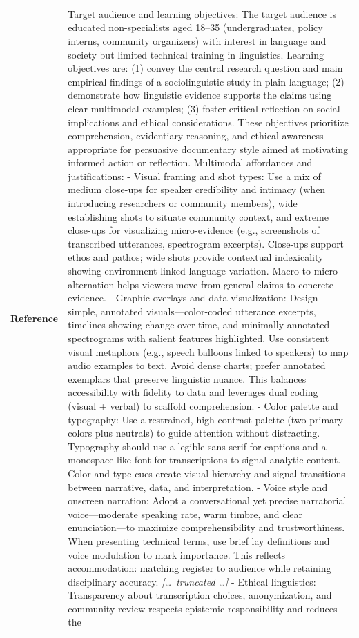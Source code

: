 \begin{longtable}{@{}l p{12.5cm}@{}}
  \textbf{Reference} & Target audience and learning objectives: The target audience is educated non-specialists aged 18--35 (undergraduates, policy interns, community organizers) with interest in language and society but limited technical training in linguistics. Learning objectives are: (1) convey the central research question and main empirical findings of a sociolinguistic study in plain language; (2) demonstrate how linguistic evidence supports the claims using clear multimodal examples; (3) foster critical reflection on social implications and ethical considerations. These objectives prioritize comprehension, evidentiary reasoning, and ethical awareness---appropriate for persuasive documentary style aimed at motivating informed action or reflection. \newline Multimodal affordances and justifications: \newline - Visual framing and shot types: Use a mix of medium close-ups for speaker credibility and intimacy (when introducing researchers or community members), wide establishing shots to situate community context, and extreme close-ups for visualizing micro-evidence (e.g., screenshots of transcribed utterances, spectrogram excerpts). Close-ups support ethos and pathos; wide shots provide contextual indexicality showing environment-linked language variation. Macro-to-micro alternation helps viewers move from general claims to concrete evidence. \newline - Graphic overlays and data visualization: Design simple, annotated visuals---color-coded utterance excerpts, timelines showing change over time, and minimally-annotated spectrograms with salient features highlighted. Use consistent visual metaphors (e.g., speech balloons linked to speakers) to map audio examples to text. Avoid dense charts; prefer annotated exemplars that preserve linguistic nuance. This balances accessibility with fidelity to data and leverages dual coding (visual + verbal) to scaffold comprehension. \newline - Color palette and typography: Use a restrained, high-contrast palette (two primary colors plus neutrals) to guide attention without distracting. Typography should use a legible sans-serif for captions and a monospace-like font for transcriptions to signal analytic content. Color and type cues create visual hierarchy and signal transitions between narrative, data, and interpretation. \newline - Voice style and onscreen narration: Adopt a conversational yet precise narratorial voice---moderate speaking rate, warm timbre, and clear enunciation---to maximize comprehensibility and trustworthiness. When presenting technical terms, use brief lay definitions and voice modulation to mark importance. This reflects accommodation: matching register to audience while retaining disciplinary accuracy. \newline \textit{[\ldots\ truncated \ldots]} \newline - Ethical linguistics: Transparency about transcription choices, anonymization, and community review respects epistemic responsibility and reduces the 
\end{longtable}
